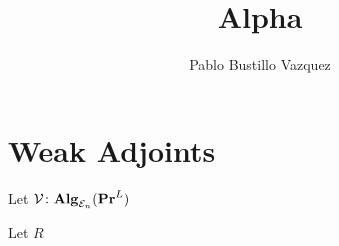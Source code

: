 \documentclass{article}
\title{Alpha}
\author{Pablo Bustillo Vazquez}
\begin{document}
\maketitle
\tableofcontents
\newpage
\section{Weak Adjoints}

Let $\mathcal{V} \colon \mathbf{Alg}_{\mathcal{E}_{n}}(\mathbf{Pr}^{L})$ 

\begin{proposition}
    Let $R$
\end{proposition}
\end{document}
